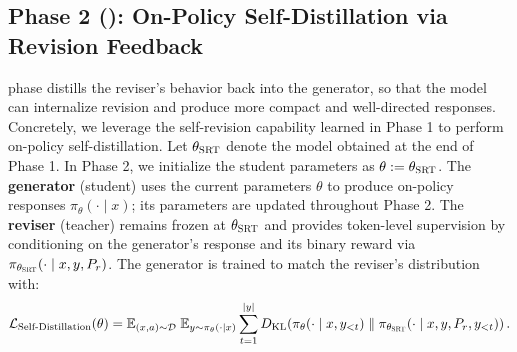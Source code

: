 

\subsection{Phase 2 (\opsd{}): On-Policy Self-Distillation via Revision Feedback}\label{sec:phase2}

\opsd{} phase distills the reviser’s behavior back into the generator, so that the model can internalize revision and produce more compact and well-directed responses. Concretely, we leverage the self-revision capability learned in Phase 1 to perform on-policy self-distillation. Let $\theta_{\textsc{SRT}{}}$ denote the model obtained at the end of Phase 1. In Phase 2, we initialize the student parameters as $\theta:=\theta_{\textsc{SRT}{}}$. 
The \textbf{generator} (student) uses the current parameters $\theta$ to produce on-policy responses $\pi_{\theta}(\cdot \mid x)$; its parameters are updated throughout Phase 2. The \textbf{reviser} (teacher) remains frozen at $\theta_{\textsc{SRT}{}}$ and provides token-level supervision by conditioning on the generator's response and its binary reward via $\pi_{\theta_{\textsc{SRT}{}}}(\cdot \mid x, y, P_r)$. The generator is trained to match the reviser's distribution with:
{\small
\begin{equation}
\mathcal{L}_{\text{Self-Distillation{}}}(\theta)
=
\mathbb{E}_{(x,a)\sim\mathcal{D}}
\;
\mathbb{E}_{y\sim\pi_\theta(\cdot\mid x)}
\sum_{t=1}^{|y|}
D_{\mathrm{KL}}\!\left(
\pi_\theta(\cdot \mid x, y_{<t})\;\|\;
\pi_{\theta_{\textsc{SRT}{}}}(\cdot \mid x, y, P_{r}, y_{<t})\right).
\label{eq:opsd}
\end{equation}
}


